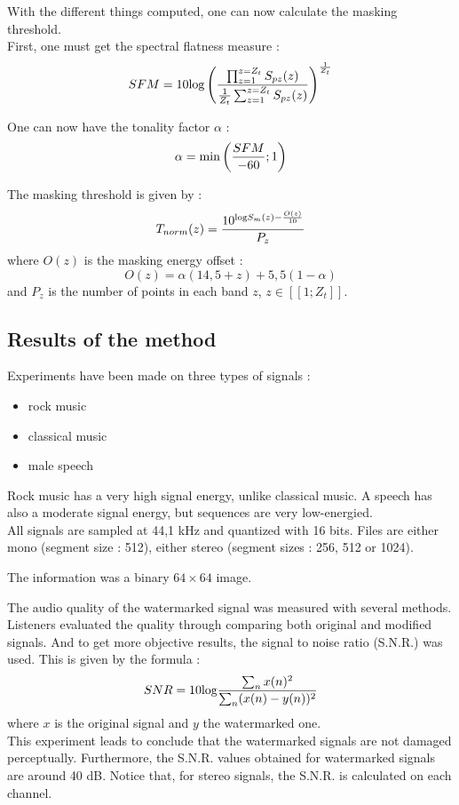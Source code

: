 With the different things computed, one can now calculate the masking threshold.\\
First, one must get the spectral flatness measure :
$$SFM = 10\textnormal{log}\left(\frac{\prod_{z = 1}^{z = Z_t} S_{pz}(z)}{\frac{1}{Z_t}\sum_{z = 1}^{z = Z_t} S_{pz}(z)}\right)^\frac{1}{Z_t}$$

One can now have the tonality factor $\alpha$ :
$$\alpha = \textnormal{min}\left(\frac{SFM}{-60} ; 1\right)$$

The masking threshold is given by :
$$T_{norm}(z) = \frac{10^{\textnormal{log} S_m(z)-\frac{O(z)}{10}}}{P_z}$$
where $O(z)$ is the masking energy offset :
$$O(z) = \alpha(14,5 + z) + 5,5(1 - \alpha)$$
and $P_z$ is the number of points in each band $z$, $z \in [\![1 ; Z_t]\!]$.

\subsection{Results of the method}
Experiments have been made on three types of signals :
\begin{itemize}
\item rock music
\item classical music
\item male speech
\end{itemize}
Rock music has a very high signal energy, unlike classical music. A speech has also a moderate signal energy, but sequences are very low-energied.\\
All signals are sampled at 44,1 kHz and quantized with 16 bits. Files are either mono (segment size : 512), either stereo (segment sizes : 256, 512 or 1024).

The information was a binary $64\times64$ image.

The audio quality of the watermarked signal was measured with several methods. Listeners evaluated the quality through comparing both original and modified signals. And to get more objective results, the signal to noise ratio (S.N.R.) was used. This is given by the formula :
$$SNR = 10\textnormal{log}\frac{\sum_{n} x(n)^2}{\sum_{n} (x(n) - y(n))^2}$$
where $x$ is the original signal and $y$ the watermarked one.\\
This experiment leads to conclude that the watermarked signals are not damaged perceptually. Furthermore, the S.N.R. values obtained for watermarked signals are around 40 dB. Notice that, for stereo signals, the S.N.R. is calculated on each channel.\\

